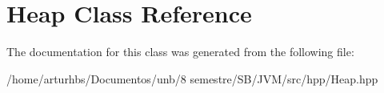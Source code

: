 \hypertarget{classHeap}{}\section{Heap Class Reference}
\label{classHeap}


The documentation for this class was generated from the following file\+:\begin{DoxyCompactItemize}
\item 
/home/arturhbs/\+Documentos/unb/8 semestre/\+S\+B/\+J\+V\+M/src/hpp/Heap.\+hpp\end{DoxyCompactItemize}
